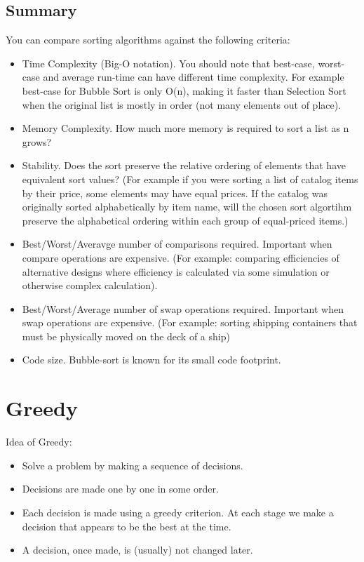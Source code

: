\documentclass[a4paper,11pt,twoside]{book}
\begin{document}
\subsection{Summary}
\par You can compare sorting algorithms against the following criteria:
\begin{itemize}
	\item Time Complexity (Big-O notation). You should note that best-case, worst-case and average run-time can have different time complexity. For example best-case for Bubble Sort is only O(n), making it faster than Selection Sort when the original list is mostly in order (not many elements out of place).
	\item Memory Complexity. How much more memory is required to sort a list as n grows?
	
	\item Stability. Does the sort preserve the relative ordering of elements that have equivalent sort values? (For example if you were sorting a list of catalog items by their price, some elements may have equal prices. If the catalog was originally sorted alphabetically by item name, will the chosen sort algortihm preserve the alphabetical ordering within each group of equal-priced items.)
	
	\item Best/Worst/Averavge number of comparisons required. Important when compare operations are expensive. (For example: comparing efficiencies of alternative designs where efficiency is calculated via some simulation or otherwise complex calculation).
	
	\item Best/Worst/Average number of swap operations required. Important when swap operations are expensive. (For example: sorting shipping containers that must be physically moved on the deck of a ship)
	
	\item Code size. Bubble-sort is known for its small code footprint.
\end{itemize}


\section{Greedy}

\par Idea of Greedy:
\begin{itemize}
\item Solve a problem by making a sequence of decisions.

\item Decisions are made one by one in some order.

\item Each decision is made using a greedy criterion. At each stage we make a decision that appears to be the best at the time.

\item A decision, once made, is (usually) not changed later. 
\end{itemize}
\end{document}
